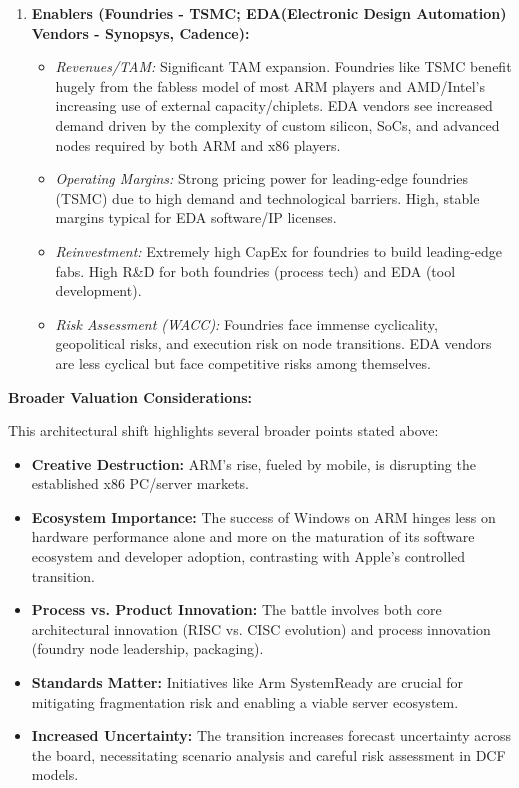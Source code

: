 \begin{enumerate}
    \item \textbf{Enablers (Foundries - TSMC; EDA(Electronic Design Automation) Vendors - Synopsys, Cadence):}
          \begin{itemize}
              \item \textit{Revenues/TAM:} Significant TAM expansion. Foundries like TSMC benefit hugely from the fabless model of most ARM players and AMD/Intel's increasing use of external capacity/chiplets. EDA vendors see increased demand driven by the complexity of custom silicon, SoCs, and advanced nodes required by both ARM and x86 players.
              \item \textit{Operating Margins:} Strong pricing power for leading-edge foundries (TSMC) due to high demand and technological barriers. High, stable margins typical for EDA software/IP licenses.
              \item \textit{Reinvestment:} Extremely high CapEx for foundries to build leading-edge fabs. High R\&D for both foundries (process tech) and EDA (tool development).
              \item \textit{Risk Assessment (WACC):} Foundries face immense cyclicality, geopolitical risks, and execution risk on node transitions. EDA vendors are less cyclical but face competitive risks among themselves.
          \end{itemize}
\end{enumerate}

\textbf{Broader Valuation Considerations:}

This architectural shift highlights several broader points stated above:
\begin{itemize}
    \item \textbf{Creative Destruction:} ARM's rise, fueled by mobile, is disrupting the established x86 PC/server markets.
    \item \textbf{Ecosystem Importance:} The success of Windows on ARM hinges less on hardware performance alone and more on the maturation of its software ecosystem and developer adoption, contrasting with Apple's controlled transition.
    \item \textbf{Process vs. Product Innovation:} The battle involves both core architectural innovation (RISC vs. CISC evolution) and process innovation (foundry node leadership, packaging).
    \item \textbf{Standards Matter:} Initiatives like Arm SystemReady are crucial for mitigating fragmentation risk and enabling a viable server ecosystem.
    \item \textbf{Increased Uncertainty:} The transition increases forecast uncertainty across the board, necessitating scenario analysis and careful risk assessment in DCF models.
\end{itemize}

